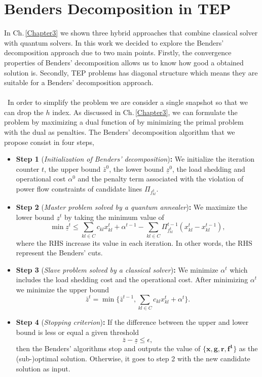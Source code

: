 \section{Benders Decomposition in TEP}
In Ch.\,\ref{Chapter3} we shown three hybrid approaches that combine classical solver with quantum solvers. In this work we decided to explore the Benders' decomposition approach due to two main points. Firstly, the convergence properties of Benders' decomposition allows us to know how good a obtained solution is. Secondly, TEP problems has diagonal structure which means they are suitable for a Benders' decomposition approach.\\\\\
In order to simplify the problem we are consider a single snapshot so that we can drop the $h$ index. As discussed in Ch.\,\ref{Chapter3}, we can formulate the problem by maximizing a dual function of by minimizing the primal problem with the dual as penalties. The Benders' decomposition algorithm that we propose consist in four steps,
\begin{itemize}
    \item \textbf{Step 1} (\textit{Initialization of Benders’ decomposition})\textbf{:} We initialize the iteration counter $t$, the upper bound $\bar{z}^{0}$, the lower bound $\underline{z}^{0}$, the load shedding and operational cost $\alpha^{0}$ and the penalty term associated with the violation of power flow constraints of candidate lines $\Pi_{f_{kl}^{1}}$.
    \item \textbf{Step 2} (\textit{Master problem solved by a quantum annealer})\textbf{:} We maximize the lower bound $\underline{z}^{t}$ by taking the minimum value of 
    \begin{equation}
      \min \underline{z}^{t} \leq \sum_{kl\in C}c_{kl}x_{kl}^{t} + \alpha^{t-1} - \sum_{kl\in C}\Pi^{t-1}_{f_{kl}^{1}}\left(x_{kl}^{t} - x_{kl}^{t-1}\right),  
    \end{equation}
    where the RHS increase its value in each iteration. In other words, the RHS represent the Benders' cuts.
    \item \textbf{Step 3} (\textit{Slave problem solved by a classical solver})\textbf{:} We minimize $\alpha^{t}$ which includes the load shedding cost and the operational cost. After minimizing $\alpha^{t}$ we minimize the upper bound
    \begin{equation}
        \bar{z}^{t} = \min \{\bar{z}^{t-1}, \sum_{kl \in C}c_{kl}x_{kl}^{t} + \alpha^{t}\}.
    \end{equation}
    \item \textbf{Step 4} (\textit{Stopping criterion})\textbf{:} If the difference between the upper and lower bound is less or equal a given threshold
    \begin{equation}
        \bar{z} - \underline{z} \leq \epsilon,
    \end{equation}
    then the Benders' algorithms stop and outputs the value of $\{\mathbf{x},\mathbf{g},\mathbf{r},\mathbf{f^{1}}\}$ as the (sub-)optimal solution. Otherwise, it goes to step 2 with the new candidate solution as input.
\end{itemize}
